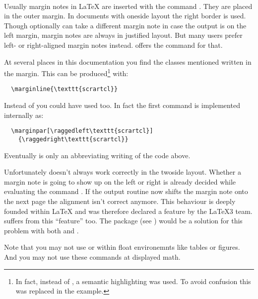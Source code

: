 \begin{Declaration}
  \\
\end{Declaration}%
%
%
Usually margin notes in {\LaTeX} are
inserted with the command . They are placed in the
outer margin.  In documents with oneside layout the right border is
used. Though  optionally can take a different margin
note in case the output is on the left margin, margin notes are always
in justified layout.  But many users prefer left- or right-aligned
margin notes instead.  {\KOMAScript} offers the command
 for that.
\begin{Example}
  At several places in this documentation you find the classes mentioned
  written in the margin. This can be produced\footnote{In fact, instead
  of , a semantic highlighting was used. To avoid confusion
  this was replaced in the example.} with:
\begin{lstlisting}
  \marginline{\texttt{scrartcl}}
\end{lstlisting}

  Instead of  you could have used 
  too. In fact the first command is implemented internally as:
\begin{lstlisting}
  \marginpar[\raggedleft\texttt{scrartcl}]
    {\raggedright\texttt{scrartcl}}
\end{lstlisting}
  Eventually  is only an abbreviating writing of the
  code above.
\end{Example}
%
\begin{Explain}
  Unfortunately  doesn't always work correctly in the
  twoside layout. Whether a margin note is going to show
  up on the left or right is already decided while evaluating the command
  . If the output routine now shifts the margin note
  onto the next page the alignment isn't correct anymore. This behaviour
  is deeply founded within {\LaTeX} and was therefore declared a feature
  by the \LaTeX3 team.  suffers from this ``feature''
  too. The package  (see
  \cite{package:mparhack}) would be a solution for this problem with both
   and .

  Note that you may not use  or  within
  float environemnts like tables or figures. And you may not use these
  commands at displayed math.
\end{Explain}
%
%
%


